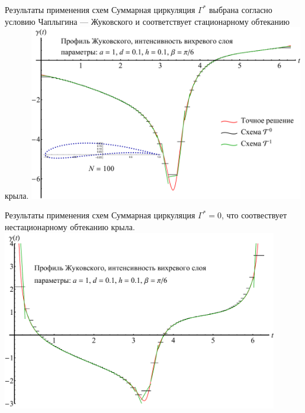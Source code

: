 \documentclass[ignoreonframetext,unicode]{beamer}
\begin{document}
\begin{frame}{Результаты применения схем}
	Суммарная циркуляция $\Gamma^{\ast}$ выбрана согласно условию Чаплыгина --- Жуковского
	и соответствует стационарному обтеканию крыла.
	\includegraphics[width=0.9\textwidth]{wing100boundSol_toYuliya}
\end{frame}
\begin{frame}{Результаты применения схем}
	Суммарная циркуляция $\Gamma^{\ast}=0$, что соотвествует нестационарному обтеканию крыла.	
	\includegraphics[width=0.9\textwidth]{wing100unboundSol_toYuliya}
\end{frame}
\end{document}
